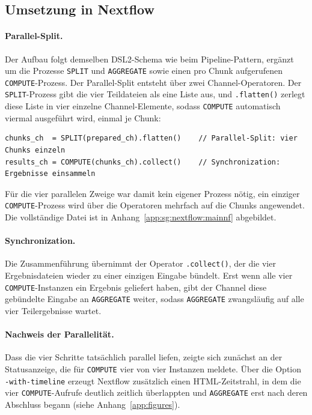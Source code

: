 \subsection{Umsetzung in Nextflow}
\label{sec:practical:scattergather:nextflow}

\paragraph{Parallel-Split.}
Der Aufbau folgt demselben DSL2-Schema wie beim Pipeline-Pattern, ergänzt um die Prozesse
\texttt{SPLIT} und \texttt{AGGREGATE} sowie einen pro Chunk aufgerufenen \texttt{COMPUTE}-Prozess.
Der Parallel-Split entsteht über zwei Channel-Operatoren. Der \texttt{SPLIT}-Prozess gibt die vier
Teildateien als eine Liste aus, und \texttt{.flatten()} zerlegt diese Liste in vier einzelne
Channel-Elemente, sodass \texttt{COMPUTE} automatisch viermal ausgeführt wird, einmal je Chunk:

\begin{lstlisting}[caption={flatten und collect im workflow-Block (Nextflow, Scatter-Gather)},label={lst:sg:nf:fc}]
chunks_ch  = SPLIT(prepared_ch).flatten()    // Parallel-Split: vier Chunks einzeln
results_ch = COMPUTE(chunks_ch).collect()    // Synchronization: Ergebnisse einsammeln
\end{lstlisting}

Für die vier parallelen Zweige war damit kein eigener Prozess nötig, ein einziger
\texttt{COMPUTE}-Prozess wird über die Operatoren mehrfach auf die Chunks angewendet. Die
vollständige Datei ist in Anhang~\ref{app:sg:nextflow:mainnf} abgebildet.

\paragraph{Synchronization.}
Die Zusammenführung übernimmt der Operator \texttt{.collect()}, der die vier Ergebnisdateien wieder
zu einer einzigen Eingabe bündelt. Erst wenn alle vier \texttt{COMPUTE}-Instanzen ein Ergebnis
geliefert haben, gibt der Channel diese gebündelte Eingabe an \texttt{AGGREGATE} weiter, sodass
\texttt{AGGREGATE} zwangsläufig auf alle vier Teilergebnisse wartet.

\paragraph{Nachweis der Parallelität.}
Dass die vier Schritte tatsächlich parallel liefen, zeigte sich zunächst an der Statusanzeige, die
für \texttt{COMPUTE} vier von vier Instanzen meldete. Über die Option \texttt{-with-timeline} erzeugt
Nextflow zusätzlich einen HTML-Zeitstrahl, in dem die vier \texttt{COMPUTE}-Aufrufe deutlich
zeitlich überlappten und \texttt{AGGREGATE} erst nach deren Abschluss begann (siehe
Anhang~\ref{app:figures}).

